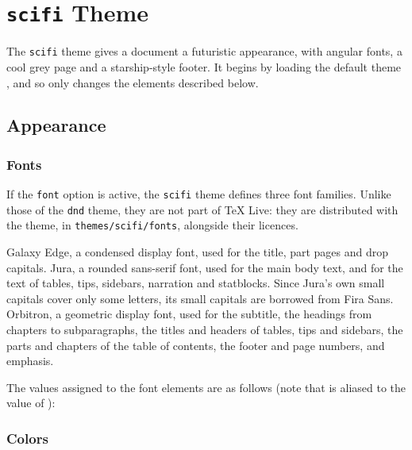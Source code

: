 
\clearpage
{}
\chapter{\texttt{scifi} Theme}\label{Theme:scifi}

	The \texttt{scifi} theme gives a document a futuristic appearance, with angular fonts, a cool grey page and a starship-style footer. It begins by loading the default theme , and so only changes the elements described below.

	\section{Appearance}
		\subsection{Fonts}

			If the \texttt{font} option is active, the \texttt{scifi} theme defines three font families. Unlike those of the \texttt{dnd} theme, they are not part of TeX Live: they are distributed with the theme, in \texttt{themes/scifi/fonts}, alongside their licences.

			{
				{\galaxy Galaxy Edge}, a condensed display font, used for the title, part pages and drop capitals.
			}
			{
				{\jura Jura}, a rounded sans-serif font, used for the main body text, and for the text of tables, tips, sidebars, narration and statblocks. Since Jura's own small capitals cover only some letters, its small capitals are borrowed from Fira Sans.
			}
			{
				{\scifi Orbitron}, a geometric display font, used for the subtitle, the headings from chapters to subparagraphs, the titles and headers of tables, tips and sidebars, the parts and chapters of the table of contents, the footer and page numbers, and emphasis.
			}

			The values assigned to the font elements are as follows (note that  is aliased to the value of ):

			\InsertFontTable{}

		\subsection{Colors}\label{S:ScifiColor}

